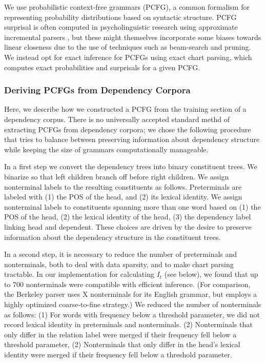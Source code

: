 \documentclass[11pt,letterpaper]{article}
\begin{document}
We use probabilistic context-free grammars (PCFG), a common formalism for representing probability distributions based on syntactic structure.
PCFG surprisal is often computed in psycholinguistic research using approximate incremental parsers \cite{DBLP:journals/coling/Roark01,DBLP:journals/coling/DembergKK13,DBLP:journals/topics/SchijndelES13}, but these might themselves incorporate some biases towards linear closeness due to the use of techniques such as beam-search and pruning.
We instead opt for exact inference for PCFGs using exact chart parsing, which computes exact probabilities and surprisals for a given PCFG.

\subsubsection{Deriving PCFGs from Dependency Corpora}

Here, we describe how we constructed a PCFG from the training section of a dependency corpus.
There is no universally accepted standard methd of extracting PCFGs from dependency corpora; we chose the following procedure that tries to balance between preserving information about dependency structure while keeping the size of grammars computationally manageable.

In a first step we convert the dependency trees into binary constituent trees. We binarize so that left children branch off before right children.
We assign nonterminal labels to the resulting constituents as follows.
Preterminals are labeled with (1) the POS of the head, and (2) its lexical identity.
We assign nonterminal labels to constituents spanning more than one word based on (1) the POS of the head, (2) the lexical identity of the head, (3) the dependency label linking head and dependent.
These choices are driven by the desire to preserve information about the dependency structure in the constituent trees.

In a second step, it is necessary to reduce the number of preterminals and nonterminals, both to deal with data sparsity, and to make chart parsing tractable.
In our implementation for calculating $I_t$ (see below), we found that up to 700 nonterminals were compatible with efficient inference.
(For comparison, the Berkeley parser uses X nonterminals for its English grammar, but employs a highly optimized coarse-to-fine strategy.)
We reduced the number of nonterminals as follows:
(1) For words with frequency below a threshold parameter, we did not record lexical identity in preterminals and nonterminals.
(2) Nonterminals that only differ in the relation label were merged if their frequency fell below a threshold parameter,
(2) Nonterminals that only differ in the head's lexical identity were merged if their frequency fell below a threshold parameter.
\end{document}

